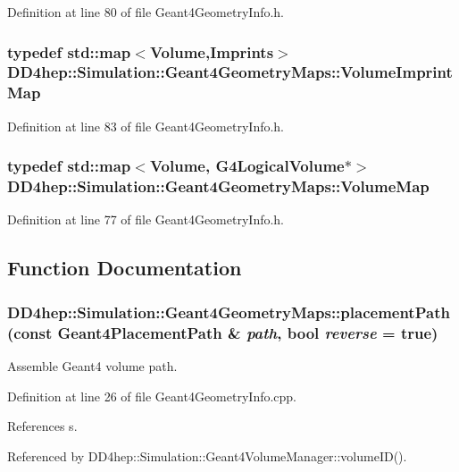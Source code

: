 Definition at line 80 of file Geant4GeometryInfo.h.\hypertarget{namespace_d_d4hep_1_1_simulation_1_1_geant4_geometry_maps_aade714d6f596f4d83009dcc2f3968d86}{
\subsubsection[{VolumeImprintMap}]{\setlength{\rightskip}{0pt plus 5cm}typedef std::map$<$Volume,{\bf Imprints}$>$ {\bf DD4hep::Simulation::Geant4GeometryMaps::VolumeImprintMap}}}
\label{namespace_d_d4hep_1_1_simulation_1_1_geant4_geometry_maps_aade714d6f596f4d83009dcc2f3968d86}


Definition at line 83 of file Geant4GeometryInfo.h.\hypertarget{namespace_d_d4hep_1_1_simulation_1_1_geant4_geometry_maps_a85199a23e6a837678c8e5d5f902fb2e2}{
\subsubsection[{VolumeMap}]{\setlength{\rightskip}{0pt plus 5cm}typedef std::map$<$Volume, G4LogicalVolume$\ast$$>$ {\bf DD4hep::Simulation::Geant4GeometryMaps::VolumeMap}}}
\label{namespace_d_d4hep_1_1_simulation_1_1_geant4_geometry_maps_a85199a23e6a837678c8e5d5f902fb2e2}


Definition at line 77 of file Geant4GeometryInfo.h.

\subsection{Function Documentation}
\hypertarget{namespace_d_d4hep_1_1_simulation_1_1_geant4_geometry_maps_af627f19c95eb3ca249c7464078af28dc}{
\subsubsection[{placementPath}]{ DD4hep::Simulation::Geant4GeometryMaps::placementPath (const Geant4PlacementPath \& {\em path}, \/  bool {\em reverse} = {\ttfamily true})}}
\label{namespace_d_d4hep_1_1_simulation_1_1_geant4_geometry_maps_af627f19c95eb3ca249c7464078af28dc}


Assemble Geant4 volume path. 

Definition at line 26 of file Geant4GeometryInfo.cpp.

References s.

Referenced by DD4hep::Simulation::Geant4VolumeManager::volumeID().